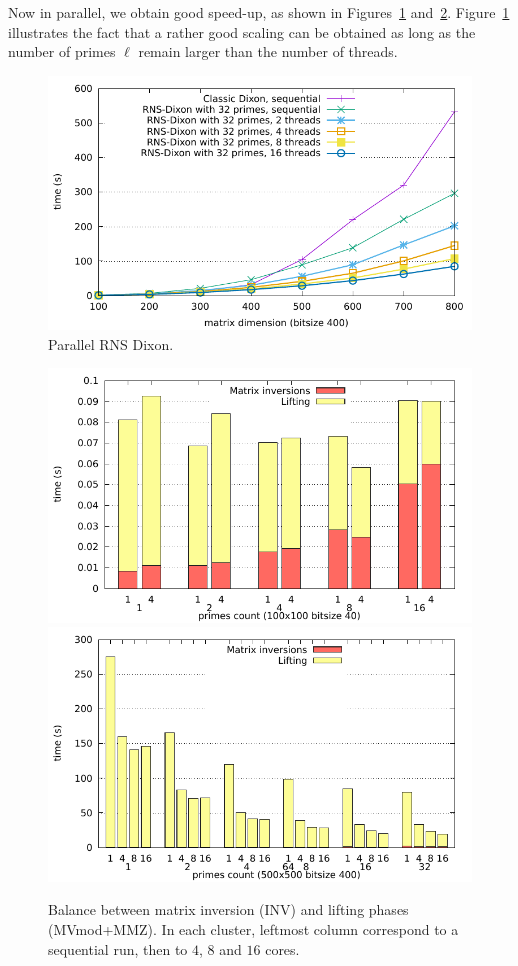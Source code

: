 Now in parallel, we obtain good speed-up, as shown in
Figures~\ref{fig:rnsdixon_parallel_threads} and~\ref{fig:rnsdixon_parallel}.
Figure~\ref{fig:rnsdixon_parallel_threads} illustrates the fact that a rather
good scaling can be obtained as long as the number of primes $\ell$ remain
larger than the number of threads.
\begin{figure}[htbp]
\begin{center}
  \includegraphics[width=.8\textwidth]{Pictures/RNSDixon/parallel-threads}
\end{center}
\caption{Parallel RNS Dixon.}\label{fig:rnsdixon_parallel_threads}
\end{figure}
\begin{figure}[htbp]
\begin{center}
  \includegraphics[width=.8\textwidth]{Pictures/RNSDixon/parallel-detailed_100n_40b}
  \includegraphics[width=.8\textwidth]{Pictures/RNSDixon/parallel-detailed_500n_400b_total}
\end{center}
\caption{Balance between matrix inversion (INV) and lifting phases
  (MVmod+MMZ). In each cluster, leftmost column correspond to a
  sequential run, then to $4$, $8$ and $16$ cores.}\label{fig:rnsdixon_parallel}
\end{figure}

